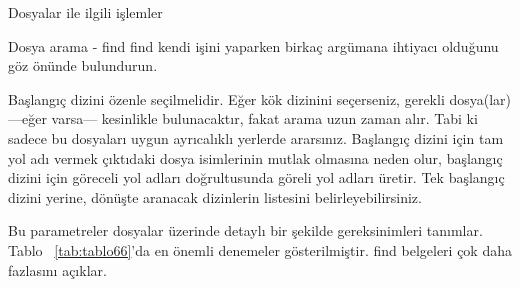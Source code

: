 \begin{section}{Dosyalar ile ilgili işlemler}
\begin{subsection}{Dosya arama - find}
find kendi işini yaparken birkaç argümana ihtiyacı olduğunu göz önünde bulundurun.

Başlangıç dizini özenle seçilmelidir. Eğer kök dizinini seçerseniz, gerekli dosya(lar) —eğer varsa— kesinlikle bulunacaktır, fakat arama uzun zaman alır. Tabi ki sadece bu dosyaları uygun ayrıcalıklı yerlerde ararsınız. Başlangıç dizini için tam yol adı vermek çıktıdaki dosya isimlerinin mutlak olmasına neden olur, başlangıç dizini için göreceli yol adları doğrultusunda göreli yol adları üretir. Tek başlangıç dizini yerine, dönüşte aranacak dizinlerin listesini belirleyebilirsiniz.

Bu parametreler dosyalar üzerinde detaylı bir şekilde gereksinimleri tanımlar. Tablo ~\ref{tab:tablo66}'da en önemli denemeler gösterilmiştir. find belgeleri çok daha fazlasını açıklar.


\end{subsection}
\end{section}
